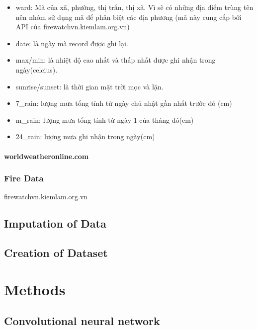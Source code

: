 \documentclass{article}
\begin{document}
\begin{itemize}
      \item ward: Mã của xã, phường, thị trấn, thị xã. Vì sẽ có những địa điểm trùng tên nên nhóm sử dụng mã để phân biệt các địa phương (mã này cung cấp bởi API của firewatchvn.kiemlam.org.vn\cite{website:firewatch-administrative})
      \item date: là ngày mà record được ghi lại.
      \item max/min: là nhiệt độ cao nhất và thấp nhất được ghi nhận trong ngày(celcius).
      \item sunrise/sunset: là thời gian mặt trời mọc và lặn.
      \item 7\_rain: lượng mưa tổng tính từ ngày chủ nhật gần nhất trước đó (cm)
      \item m\_rain: lượng mưa tổng tính từ ngày 1 của tháng đó(cm)
      \item 24\_rain: lượng mưa ghi nhận trong ngày(cm)
\end{itemize}


\paragraph{worldweatheronline.com}

\subsubsection{Fire Data}
firewatchvn.kiemlam.org.vn

\subsection{Imputation of Data}
\subsection{Creation of Dataset}



\section{Methods}

\subsection{Convolutional neural network}
\end{document}
